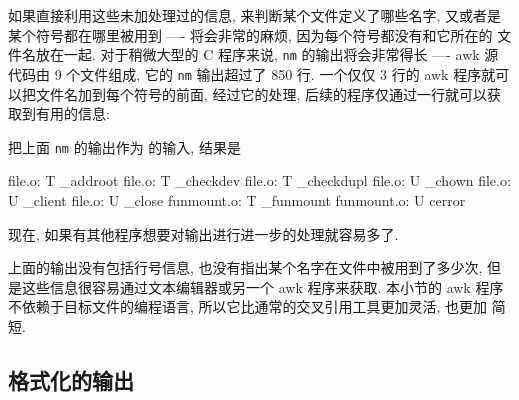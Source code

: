 如果直接利用这些未加处理过的信息, 来判断某个文件定义了哪些名字, 又或者是
某个符号都在哪里被用到 ---- 将会非常的麻烦, 因为每个符号都没有和它所在的
文件名放在一起. 对于稍微大型的 C 程序来说, \verb'nm' 的输出将会非常得长
---- awk 源代码由 9 个文件组成, 它的 \verb'nm' 输出超过了 850 行.
一个仅仅 3 行的 awk 程序就可以把文件名加到每个符号的前面, 经过它的处理,
后续的程序仅通过一行就可以获取到有用的信息:
把上面 \verb'nm' 的输出作为  的输入, 结果是
\begin{awkcode}
    file.o: T _addroot
    file.o: T _checkdev
    file.o: T _checkdupl
    file.o: U _chown
    file.o: U _client
    file.o: U _close
    funmount.o: T _funmount
    funmount.o: U cerror
\end{awkcode}
现在, 如果有其他程序想要对输出进行进一步的处理就容易多了.

上面的输出没有包括行号信息, 也没有指出某个名字在文件中被用到了多少次, 
但是这些信息很容易通过文本编辑器或另一个 awk 程序来获取. 本小节的 awk 程序 
不依赖于目标文件的编程语言, 所以它比通常的交叉引用工具更加灵活, 也更加
简短.

\subsection{格式化的输出}
\label{subsec:formatted_output}

